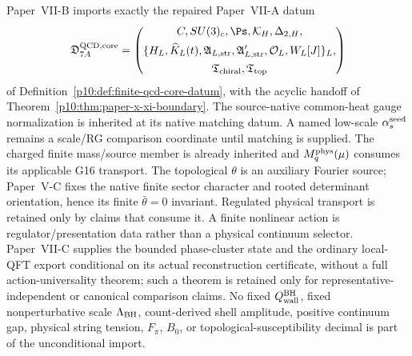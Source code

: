 \documentclass[12pt,a4paper]{article}
\providecommand{\alphasseed}{\alpha_s^{\rm seed}}
\begin{document}
\begin{definition}
\label{p11:def:imported-paper-x-core-datum}
Paper~VII-B imports exactly the repaired Paper~VII-A datum
\[
\mathfrak D_{7A}^{\rm QCD,core}
=\left(\begin{gathered}
C,SU(3)_c,\Ps,\mathcal K_H,\Delta_{2,H},\\
\{H_L,\widehat K_L(t),\mathfrak A_{L,{\rm str}},
\mathfrak A'_{L,{\rm str}},\mathcal O_L,W_L[J]\}_L,\\
\mathfrak T_{\rm chiral},\mathfrak T_{\rm top}
\end{gathered}\right)
\]
of Definition~\ref{p10:def:finite-qcd-core-datum}, with the acyclic handoff of Theorem~\ref{p10:thm:paper-x-xi-boundary}.  The source-native common-heat gauge normalization is inherited at its native matching datum.  A named low-scale \(\alphasseed\) remains a scale/RG comparison coordinate until matching is supplied.  The charged finite mass/source member is already inherited and \(M_q^{\rm phys}(\mu)\) consumes its applicable G16 transport.  The topological \(\theta\) is an auxiliary Fourier source; Paper~V-C fixes the native finite sector character and rooted determinant orientation, hence its finite \(\bar\theta=0\) invariant. Regulated physical transport is retained only by claims that consume it.  A finite nonlinear action is regulator/presentation data rather than a physical continuum selector.  Paper~VII-C supplies the bounded phase-cluster state and the ordinary local-QFT
export conditional on its actual reconstruction certificate, without a full
action-universality theorem; such a theorem is retained only for representative-independent or canonical comparison claims.  No fixed \(Q_{\rm wall}^{\rm BH}\), fixed nonperturbative scale \(\Lambda_{\rm BH}\), count-derived shell amplitude, positive continuum gap, physical string tension, \(F_\pi\), \(B_0\), or topological-susceptibility decimal is part of the unconditional import.
\end{definition}
\end{document}
